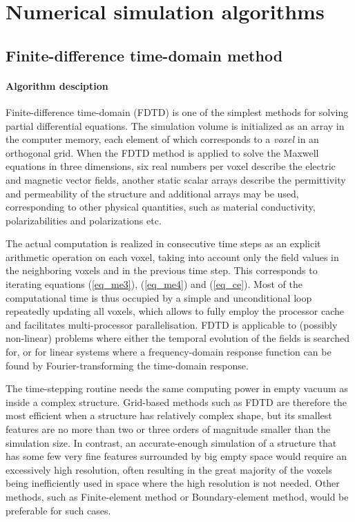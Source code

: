 \section{Numerical simulation algorithms} \label{chapter_numerical}
\subsection{Finite-difference time-domain method}
\paragraph{Algorithm desciption} %
Finite-difference time-domain (FDTD) is one of the simplest methods for solving partial differential equations. The simulation volume is initialized as an array in the computer memory, each element of which corresponds to a \textit{voxel} in an orthogonal grid. When the FDTD method is applied to solve the Maxwell equations in three dimensions, six real numbers per voxel describe the electric and magnetic vector fields, another static scalar arrays describe the permittivity and permeability of the structure and additional arrays may be used, corresponding to other physical quantities, such as material conductivity, polarizabilities and polarizations etc. 

The actual computation is realized in consecutive time steps as an explicit arithmetic operation on each voxel, taking into account only the field values in the neighboring voxels and in the previous time step. This corresponds to iterating equations (\ref{eq_me3}), (\ref{eq_me4}) and (\ref{eq_ce}). %
Most of the computational time is thus occupied by a simple and unconditional loop repeatedly updating all voxels, which allows to fully employ the processor cache and facilitates multi-processor parallelisation. FDTD is applicable to (possibly non-linear) problems where either the temporal evolution of the fields is searched for, or for linear systems where a frequency-domain response function can be found by Fourier-transforming the time-domain response. 

The time-stepping routine needs the same computing power in empty vacuum as inside a complex structure. Grid-based methods such as FDTD are therefore the most efficient when a structure has relatively complex shape, but its smallest features are no more than two or three orders of magnitude smaller than the simulation size. In contrast, an accurate-enough simulation of a structure that has some few very fine features surrounded by big empty space would require an excessively high resolution, often resulting in the great majority of the voxels being inefficiently used in space where the high resolution is not needed. Other methods, %
such as Finite-element method or Boundary-element method, would be preferable for such cases.

